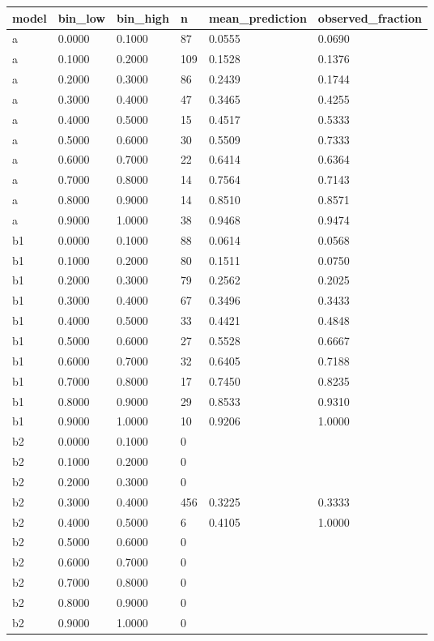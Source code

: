 \begin{tabular}{llllll}
\hline
model & bin\_low & bin\_high & n & mean\_prediction & observed\_fraction \\
\hline
a & 0.0000 & 0.1000 & 87 & 0.0555 & 0.0690 \\
a & 0.1000 & 0.2000 & 109 & 0.1528 & 0.1376 \\
a & 0.2000 & 0.3000 & 86 & 0.2439 & 0.1744 \\
a & 0.3000 & 0.4000 & 47 & 0.3465 & 0.4255 \\
a & 0.4000 & 0.5000 & 15 & 0.4517 & 0.5333 \\
a & 0.5000 & 0.6000 & 30 & 0.5509 & 0.7333 \\
a & 0.6000 & 0.7000 & 22 & 0.6414 & 0.6364 \\
a & 0.7000 & 0.8000 & 14 & 0.7564 & 0.7143 \\
a & 0.8000 & 0.9000 & 14 & 0.8510 & 0.8571 \\
a & 0.9000 & 1.0000 & 38 & 0.9468 & 0.9474 \\
b1 & 0.0000 & 0.1000 & 88 & 0.0614 & 0.0568 \\
b1 & 0.1000 & 0.2000 & 80 & 0.1511 & 0.0750 \\
b1 & 0.2000 & 0.3000 & 79 & 0.2562 & 0.2025 \\
b1 & 0.3000 & 0.4000 & 67 & 0.3496 & 0.3433 \\
b1 & 0.4000 & 0.5000 & 33 & 0.4421 & 0.4848 \\
b1 & 0.5000 & 0.6000 & 27 & 0.5528 & 0.6667 \\
b1 & 0.6000 & 0.7000 & 32 & 0.6405 & 0.7188 \\
b1 & 0.7000 & 0.8000 & 17 & 0.7450 & 0.8235 \\
b1 & 0.8000 & 0.9000 & 29 & 0.8533 & 0.9310 \\
b1 & 0.9000 & 1.0000 & 10 & 0.9206 & 1.0000 \\
b2 & 0.0000 & 0.1000 & 0 &  &  \\
b2 & 0.1000 & 0.2000 & 0 &  &  \\
b2 & 0.2000 & 0.3000 & 0 &  &  \\
b2 & 0.3000 & 0.4000 & 456 & 0.3225 & 0.3333 \\
b2 & 0.4000 & 0.5000 & 6 & 0.4105 & 1.0000 \\
b2 & 0.5000 & 0.6000 & 0 &  &  \\
b2 & 0.6000 & 0.7000 & 0 &  &  \\
b2 & 0.7000 & 0.8000 & 0 &  &  \\
b2 & 0.8000 & 0.9000 & 0 &  &  \\
b2 & 0.9000 & 1.0000 & 0 &  &  \\
\hline
\end{tabular}
